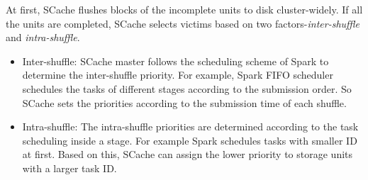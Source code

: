 At first, SCache flushes blocks of the incomplete units to disk cluster-widely.
If all the units are completed, SCache selects victims based on two factors-\textit{inter-shuffle} and \textit{intra-shuffle}.
\begin{itemize}[noitemsep]
	\item Inter-shuffle: SCache master follows the scheduling scheme of Spark to determine the inter-shuffle priority. 
	For example, Spark FIFO scheduler schedules the tasks of different stages according to the submission order. 
	So SCache sets the priorities according to the submission time of each shuffle.
	\item Intra-shuffle: The intra-shuffle priorities are determined according to the task scheduling inside a stage.
	For example Spark schedules tasks with smaller ID at first. 
	Based on this, SCache can assign the lower priority to storage units with a larger task ID.
\end{itemize}

